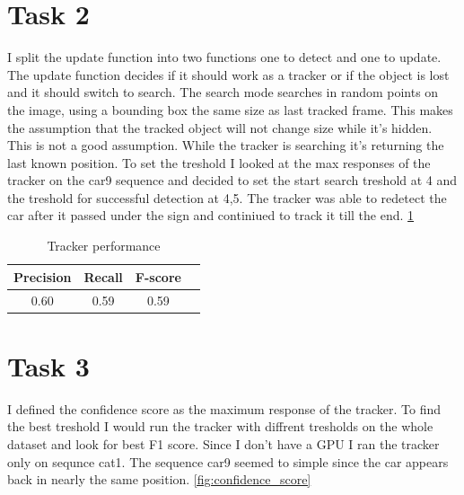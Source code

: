 \documentclass[9pt]{IEEEtran}
\begin{document}
\section{Task 2}
I split the update function into two functions one to detect and one to update. The update function decides if it should work as a tracker or if the object is lost and it should switch to search. The search mode searches in random points on the image, using a bounding box the same size as last tracked frame. This makes the assumption that the tracked object will not change size while it's hidden. This is not a good assumption. While the tracker is searching it's returning the last known position. To set the treshold I looked at the max responses of the tracker on the car9 sequence and decided to set the start search treshold at 4 and the treshold for successful detection at 4,5.  The tracker was able to redetect the car after it passed under the sign and continiued to track it till the end. \ref{tab:results_2}
\begin{table}[H]
    \centering
    \begin{tabular}{|c|c|c|c|}
    \hline
    Precision & Recall & F-score \\
    \hline
    0.60 & 0.59 & 0.59 \\
    \hline
    \end{tabular}
    \vspace{0.5em}
    \caption{Tracker performance}
    \label{tab:results_2}
    \end{table}  

\section{Task 3}
I defined the confidence score as the maximum response of the tracker. To find the best treshold I would run the tracker with diffrent tresholds on the whole dataset and look for best F1 score. Since I don't have a GPU I ran the tracker only on sequnce cat1. The sequence car9 seemed to simple since the car appears back in nearly the same position. \ref{fig:confidence_score}
\end{document}
